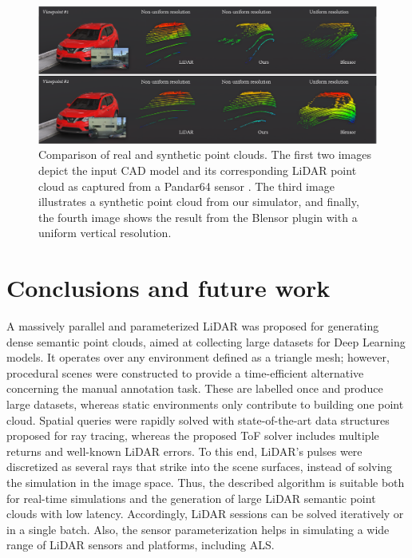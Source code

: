 \begin{figure}
    \centering
    \includegraphics[width=\linewidth]{figs/lidar_simulation/lidar_point_cloud_comparison.png}
	\caption{Comparison of real and synthetic point clouds. The first two images depict the input CAD model and its corresponding LiDAR point cloud as captured from a Pandar64 sensor \cite{hesai_pandaset_2021}. The third image illustrates a synthetic point cloud from our simulator, and finally, the fourth image shows the result from the Blensor plugin with a uniform vertical resolution. }
	\label{fig:lidar_point_cloud_comparison}
\end{figure}

\section{Conclusions and future work}

A massively parallel and parameterized LiDAR was proposed for generating dense semantic point clouds, aimed at collecting large datasets for Deep Learning models. It operates over any environment defined as a triangle mesh; however, procedural scenes were constructed to provide a time-efficient alternative concerning the manual annotation task. These are labelled once and produce large datasets, whereas static environments only contribute to building one point cloud. Spatial queries were rapidly solved with state-of-the-art data structures proposed for ray tracing, whereas the proposed ToF solver includes multiple returns and well-known LiDAR errors. To this end, LiDAR's pulses were discretized as several rays that strike into the scene surfaces, instead of solving the simulation in the image space.  Thus, the described algorithm is suitable both for real-time simulations and the generation of large LiDAR semantic point clouds with low latency. Accordingly, LiDAR sessions can be solved iteratively or in a single batch. Also, the sensor parameterization helps in simulating a wide range of LiDAR sensors and platforms, including ALS.

